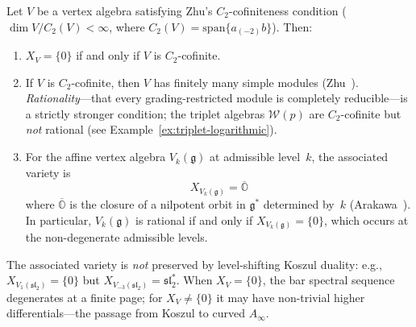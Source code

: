 \begin{theorem}
\label{thm:arakawa-rationality}
Let $V$ be a vertex algebra satisfying Zhu's $C_2$-cofiniteness
condition \textup{(}$\dim V / C_2(V) < \infty$, where
$C_2(V) = \mathrm{span}\{a_{(-2)} b\}$\textup{)}.  Then:
\begin{enumerate}[label=\textup{(\roman*)}]
\item $X_V = \{0\}$ if and only if $V$ is $C_2$-cofinite.
\item If $V$ is $C_2$-cofinite, then $V$ has finitely many simple
  modules \textup{(}Zhu~\cite{Zhu96}\textup{)}.
  \emph{Rationality}---that every grading-restricted module is
  completely reducible---is a strictly stronger condition; the
  triplet algebras $\mathcal{W}(p)$ are $C_2$-cofinite but
  \emph{not} rational
  \textup{(}see Example~\ref{ex:triplet-logarithmic}\textup{)}.
\item For the affine vertex algebra
  $V_k(\mathfrak{g})$ at admissible level~$k$, the associated variety
  is
  \[
  X_{V_k(\mathfrak{g})} = \overline{\mathbb{O}}
  \]
  where $\overline{\mathbb{O}}$ is the closure of a nilpotent
  orbit in $\mathfrak{g}^*$ determined by~$k$
  \textup{(}Arakawa~\cite{Arakawa17}\textup{)}.
  In particular, $V_k(\mathfrak{g})$ is rational if and only if
  $X_{V_k(\mathfrak{g})} = \{0\}$, which occurs at the
  non-degenerate admissible levels.
\end{enumerate}
\end{theorem}

\begin{remark}
\label{rem:associated-variety-koszul}
The associated variety is \emph{not} preserved by level-shifting Koszul duality: e.g., $X_{V_1(\mathfrak{sl}_2)} = \{0\}$ but $X_{V_{-3}(\mathfrak{sl}_2)} = \mathfrak{sl}_2^*$.  When $X_V = \{0\}$, the bar spectral sequence degenerates at a finite page; for $X_V \neq \{0\}$ it may have non-trivial higher differentials---the passage from Koszul to curved $A_\infty$.
\end{remark}

